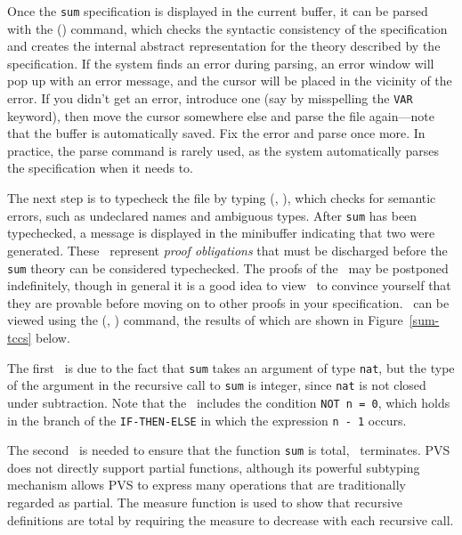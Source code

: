 Once the \texttt{sum} specification is displayed in the current buffer, it
can be parsed with the  () command, which checks the
syntactic consistency of the specification and creates the internal
abstract representation for the theory described by the specification.  If
the system finds an error during parsing, an error window will pop up with
an error message, and the cursor will be placed in the vicinity of the
error.  If you didn't get an error, introduce one (say by misspelling the
\texttt{VAR} keyword), then move the cursor somewhere else and parse the
file again---note that the buffer is automatically saved.  Fix the error
and parse once more.  In practice, the parse command is rarely used, as
the system automatically parses the specification when it needs to.


The next step is to typecheck the file by typing 
(, ), which checks for semantic errors, such as
undeclared names and ambiguous types.  After \texttt{sum} has been
typechecked, a message is displayed in the minibuffer indicating that two
\tccs{} were generated.  These \tccs\ represent
\emph{proof obligations} that must be discharged
before the \texttt{sum} theory can be considered typechecked.  The proofs
of the \tccs\ may be postponed indefinitely, though in general it is a
good idea to view \tccs\ to convince yourself that they are provable
before moving on to other proofs in your specification.  \tccs\ can be
viewed using the  (, )
command, the results of which are shown in Figure~\ref{sum-tccs} below.


The first \tcc\ is due to the fact that \texttt{sum} takes an argument of
type \texttt{nat}, but the type of the argument in the recursive call to
\texttt{sum} is integer, since \texttt{nat} is not closed under subtraction.
Note that the \tcc\ includes the condition \texttt{NOT n = 0}, which holds
in the branch of the \texttt{IF-THEN-ELSE} in which the expression
\texttt{n - 1} occurs.

The second \tcc\ is needed to ensure that the function \texttt{sum} is
total, \ie\ terminates.  PVS does not directly support partial functions,
although its powerful subtyping mechanism allows PVS to express many
operations that are traditionally regarded as partial.  The measure
function is used to show that recursive definitions are total by requiring
the measure to decrease with each recursive call.

